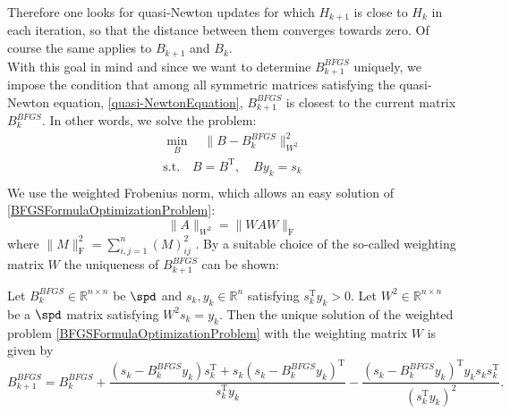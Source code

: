 Therefore one looks for quasi-Newton updates for which $H_{k+1}$ is close to $H_k$ in each iteration, so that the distance between them converges towards zero. Of course the same applies to $B_{k+1}$ and $B_k$. \\
With this goal in mind and since we want to determine $B^{BFGS}_{k+1}$ uniquely, we impose the condition that among all symmetric matrices satisfying the quasi-Newton equation, \cref{quasi-NewtonEquation}, $B^{BFGS}_{k+1}$ is closest to the current matrix $B^{BFGS}_k$. In other words, we solve the problem:
\begin{equation}\label{BFGSFormulaOptimizationProblem}
    \begin{aligned}
        \min_{B} \quad \lVert B - B^{BFGS}_k \rVert^{2}_{W^2} \\
        \textrm{s.t.} \quad B = B^{\mathrm{T}}, \quad B y_k = s_k \\
    \end{aligned}
\end{equation}
We use the weighted Frobenius norm, which allows an easy solution of \cref{BFGSFormulaOptimizationProblem}:
\begin{equation}\label{WeightedFrobenius}
    \lVert A \rVert_{W^2} = \lVert W A W \rVert_{\mathrm{F}}
\end{equation}
where $\lVert M \rVert^2_{\mathrm{F}} = \sum^n_{i,j=1} (M)^2_{ij}$ \cite[p.~138]{NocedalWright:2006}. By a suitable choice of the so-called weighting matrix $W$ the uniqueness of $B^{BFGS}_{k+1}$ can be shown: 

\begin{theorem}\label{thrGeigerKanzow11.8}
    Let $B^{BFGS}_k \in \mathbb{R}^{n \times n}$ be $\spd$ and $s_k, y_k \in \mathbb{R}^n$ satisfying $s^{\mathrm{T}}_k y_k > 0$. Let $W^2 \in \mathbb{R}^{n \times n}$ be a $\spd$ matrix satisfying $W^2 s_k = y_k$. Then the unique solution of the weighted problem \cref{BFGSFormulaOptimizationProblem} with the weighting matrix $W$ is given by
    \begin{equation*}
        B^{BFGS}_{k+1} = B^{BFGS}_k + \frac{(s_k - B^{BFGS}_k y_k) s^{\mathrm{T}}_k + s_k (s_k - B^{BFGS}_k y_k)^{\mathrm{T}}}{s^{\mathrm{T}}_k y_k} - \frac{(s_k - B^{BFGS}_k y_k)^{\mathrm{T}} y_k s_k s^{\mathrm{T}}_k}{(s^{\mathrm{T}}_k y_k)^2}.
    \end{equation*}    
\end{theorem}

